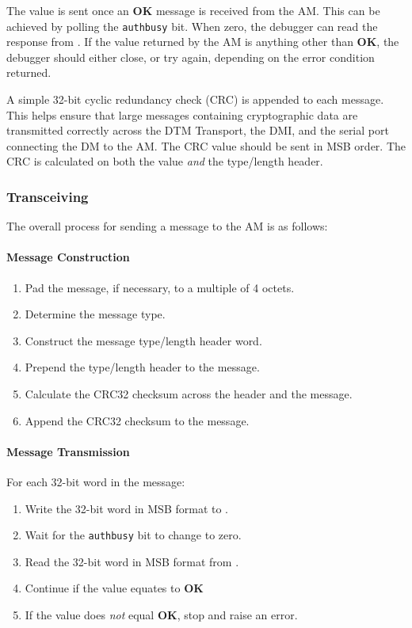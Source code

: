 The value is sent once an {\bf OK} message is received from the AM. This can be achieved by polling the {\tt authbusy} bit. When zero, the debugger can read the response from \Rauthdata. If the value returned by the AM is anything other than {\bf OK}, the debugger should either close, or try again, depending on the error condition returned.

A simple 32-bit cyclic redundancy check (CRC) is appended to each message. This helps ensure that large messages containing cryptographic data are transmitted correctly across the DTM Transport, the DMI, and the serial port connecting the DM to the AM. The CRC value should be sent in MSB order. The CRC is calculated on both the value {\em and} the type/length header. 

\subsubsection{Transceiving}
The overall process for sending a message to the AM is as follows:

\paragraph{Message Construction}
\begin{enumerate}
    \item Pad the message, if necessary, to a multiple of 4 octets.
    \item Determine the message type.
    \item Construct the message type/length header word. 
    \item Prepend the type/length header to the message.
    \item Calculate the CRC32 checksum across the header and the message.
    \item Append the CRC32 checksum to the message.
\end{enumerate}

\paragraph{Message Transmission}
For each 32-bit word in the message:
\begin{enumerate}
    \item Write the 32-bit word in MSB format to \Rauthdata.
    \item Wait for the {\tt authbusy} bit to change to zero.
    \item Read the 32-bit word in MSB format from \Rauthdata.
    \item Continue if the value equates to {\bf OK}
    \item If the value does {\em not} equal {\bf OK}, stop and raise an error.
\end{enumerate}


